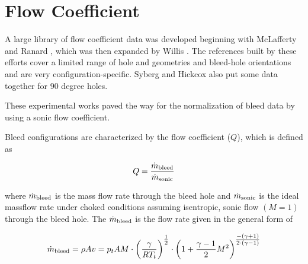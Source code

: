 
\section{Flow Coefficient}


A large library of flow coefficient data was developed beginning with McLafferty and Ranard \cite{McLafferty1958}, which was then expanded by Willis \cite{Willis1995}. The references built by these efforts cover a limited range of hole and geometries and bleed-hole orientations and are very configuration-specific. Syberg and Hickcox \cite{Syberg1973} also put some data together for 90 degree holes.

These experimental works paved the way for the normalization of bleed data by using a sonic flow coefficient.



Bleed configurations are characterized by the flow coefficient ($Q$), which is defined as

\begin{equation} Q = \frac{\dot{m}_{\textrm{bleed}}}{\dot{m}_{\textrm{sonic}}} 
	\label{eq:sonic_coeff} \end{equation}

where $\dot{m}_{\textrm{bleed}}$ is the mass flow rate through the bleed hole and $\dot{m}_{\textrm{sonic}}$ is the ideal massflow rate under choked conditions assuming isentropic, sonic flow $(M=1)$ through the bleed hole. The $\dot{m}_{\textrm{bleed}}$ is the flow rate given in the general form of

\begin{equation} \dot{m}_{\textrm{bleed}} = \rho A v = p_t A M \cdot \qty(\frac{\gamma}{RT_t})^{\textstyle\frac{1}{2}} \cdot \qty(1 + \frac{\gamma-1}{2}M^2)^{\textstyle\frac{-\qty(\gamma+1)}{2\cdot\qty(\gamma-1)}} 
	\label{eq:mdot_bleed} \end{equation}

